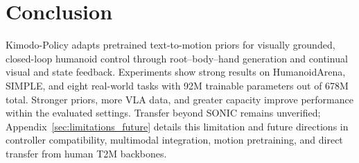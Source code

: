 \section{Conclusion}
\label{sec:conclusion}

Kimodo-Policy adapts pretrained text-to-motion priors for visually grounded, closed-loop humanoid control through root--body--hand generation and continual visual and state feedback. Experiments show strong results on HumanoidArena, SIMPLE, and eight real-world tasks with 92M trainable parameters out of 678M total. Stronger priors, more VLA data, and greater capacity improve performance within the evaluated settings. Transfer beyond SONIC remains unverified; Appendix~\ref{sec:limitations_future} details this limitation and future directions in controller compatibility, multimodal integration, motion pretraining, and direct transfer from human T2M backbones.
